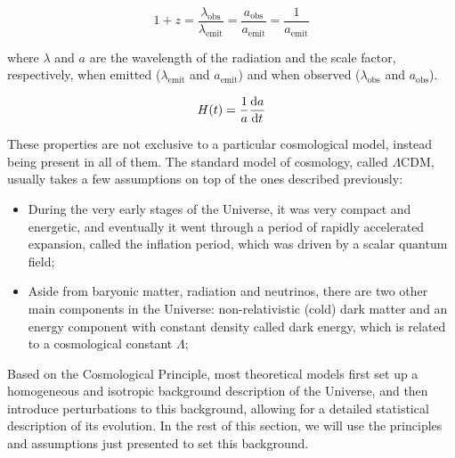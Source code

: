 \documentclass[openany,a4paper,12pt,oneside]{book}
\begin{document}
\begin{spacing}{1.5}
\begin{equation}\label{1+z}
    1+z=\frac{\lambda_{\text{obs}}}{\lambda_\text{emit}}=\frac{a_\text{obs}}{a_\text{emit}}=\frac{1}{a_\text{emit}}
\end{equation}

\noindent where $\lambda$ and $a$ are the wavelength of the radiation and the scale factor, respectively, when emitted ($\lambda_\text{emit}$ and $a_\text{emit}$) and when observed ($\lambda_\text{obs}$ and $a_\text{obs}$).


\begin{equation}\label{def:H(t)}
    H(t)=\frac{1}{a}\dv{a}{t}
\end{equation}

These properties are not exclusive to a particular cosmological model, instead being present in all of them. The standard model of cosmology, called $\Lambda$CDM, usually takes a few assumptions on top of the ones described previously:

\begin{itemize}
    \item During the very early stages of the Universe, it was very compact and energetic, and eventually it went through a period of rapidly accelerated expansion, called the inflation period, which was driven by a scalar quantum field;
    \item Aside from baryonic matter, radiation and neutrinos, there are two other main components in the Universe: non-relativistic (cold) dark matter and an energy component with constant density called dark energy, which is related to a cosmological constant $\Lambda$;
\end{itemize}


Based on the Cosmological Principle, most theoretical models first set up a homogeneous and isotropic background description of the Universe, and then introduce perturbations to this background, allowing for a detailed statistical description of its evolution. In the rest of this section, we will use the principles and assumptions just presented to set this background.


\end{spacing}
\end{document}
